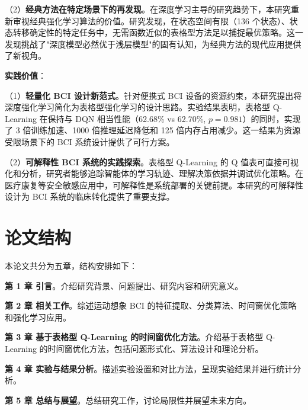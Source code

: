 （2）\textbf{经典方法在特定场景下的再发现}。在深度学习主导的研究趋势下，本研究重新审视经典强化学习算法的价值。研究发现，在状态空间有限（136 个状态）、状态转移确定性的特定任务中，无需函数近似的表格型方法足以捕捉最优策略。这一发现挑战了"深度模型必然优于浅层模型"的固有认知，为经典方法的现代应用提供了新视角。

\textbf{实践价值}：

（1）\textbf{轻量化 BCI 设计新范式}。针对便携式 BCI 设备的资源约束，本研究提出将深度强化学习简化为表格型强化学习的设计思路。实验结果表明，表格型 Q-Learning 在保持与 DQN 相当性能（62.68\% vs 62.70\%, $p = 0.981$）的同时，实现了 3 倍训练加速、1000 倍推理延迟降低和 125 倍内存占用减少。这一结果为资源受限场景下的 BCI 系统设计提供了可行方案。

（2）\textbf{可解释性 BCI 系统的实践探索}。表格型 Q-Learning 的 Q 值表可直接可视化和分析，研究者能够追踪智能体的学习轨迹、理解决策依据并调试优化策略。在医疗康复等安全敏感应用中，可解释性是系统部署的关键前提。本研究的可解释性设计为 BCI 系统的临床转化提供了重要支撑。

\section{论文结构}
\label{sec:thesis_structure}

本论文共分为五章，结构安排如下：

\textbf{第 1 章 引言}。介绍研究背景、问题提出、研究内容和研究意义。

\textbf{第 2 章 相关工作}。综述运动想象 BCI 的特征提取、分类算法、时间窗优化策略和强化学习应用。

\textbf{第 3 章 基于表格型 Q-Learning 的时间窗优化方法}。介绍基于表格型 Q-Learning 的时间窗优化方法，包括问题形式化、算法设计和理论分析。

\textbf{第 4 章 实验与结果分析}。描述实验设置和对比方法，呈现实验结果并进行统计分析。

\textbf{第 5 章 总结与展望}。总结研究工作，讨论局限性并展望未来方向。

